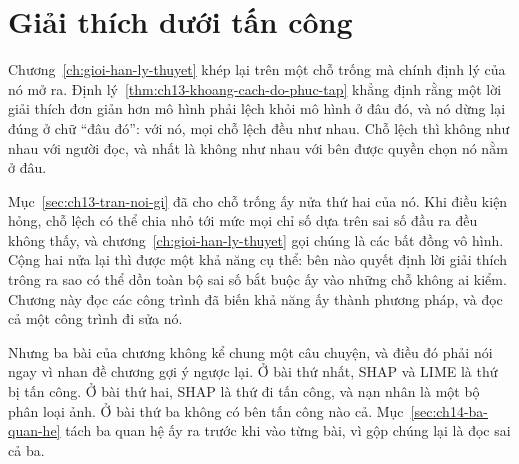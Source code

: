 %
%
\chapter{Giải thích dưới tấn công}
\label{ch:giai-thich-duoi-tan-cong}

Chương~\ref{ch:gioi-han-ly-thuyet} khép lại trên một chỗ trống mà chính định lý
của nó mở ra. Định lý~\ref{thm:ch13-khoang-cach-do-phuc-tap} khẳng định rằng
một lời giải thích đơn giản hơn mô hình phải lệch khỏi mô hình ở đâu đó, và nó
dừng lại đúng ở chữ \enquote{đâu đó}: với nó, mọi chỗ lệch đều như nhau. Chỗ
lệch thì không như nhau với người đọc, và nhất là không như nhau với bên được
quyền chọn nó nằm ở đâu.

Mục~\ref{sec:ch13-tran-noi-gi} đã cho chỗ trống ấy nửa thứ hai của nó. Khi điều
kiện  hỏng, chỗ lệch có thể chia nhỏ tới mức
mọi chỉ số dựa trên sai số đầu ra đều không thấy, và
chương~\ref{ch:gioi-han-ly-thuyet} gọi chúng là các bất đồng vô hình. Cộng hai
nửa lại thì được một khả năng cụ thể: bên nào quyết định lời giải thích trông
ra sao có thể dồn toàn bộ sai số bắt buộc ấy vào những chỗ không ai kiểm.
Chương này đọc các công trình đã biến khả năng ấy thành phương pháp, và đọc cả
một công trình đi sửa nó.

Nhưng ba bài của chương không kể chung một câu chuyện, và điều đó phải nói ngay
vì nhan đề chương gợi ý ngược lại. Ở bài thứ nhất, SHAP và LIME là thứ bị tấn
công. Ở bài thứ hai, SHAP là thứ đi tấn công, và nạn nhân là một bộ phân loại
ảnh. Ở bài thứ ba không có bên tấn công nào cả. Mục~\ref{sec:ch14-ba-quan-he}
tách ba quan hệ ấy ra trước khi vào từng bài, vì gộp chúng lại là đọc sai cả
ba.


